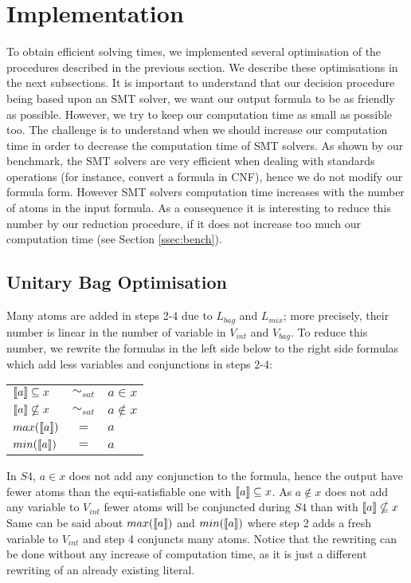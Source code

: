 
\section{Implementation}
\label{sec:implementation}
To obtain efficient solving times, we implemented several optimisation of the procedures described in the previous section.
We describe these optimisations in the next subsections.
It is important to understand that our decision procedure being based upon an SMT solver, we want our output formula to be as friendly as possible.
However, we try to keep our computation time as small as possible too.
The challenge is to understand when we should increase our computation time in order to decrease the computation time of SMT solvers.
As shown by our benchmark, the SMT solvers are very efficient when dealing with standards operations (for instance, convert a formula in CNF), hence we do not modify our formula form.
However SMT solvers computation time increases with the number of atoms in the input formula. As a consequence it is interesting to reduce this number by
our reduction procedure, if it does not increase too much our computation time (see Section \ref{ssec:bench}).

\subsection{Unitary Bag Optimisation}
Many atoms are added in steps 2-4 due to $L_{bag}$ and $L_{mix}$; more precisely, their number is linear in the number of variable in $V_{int}$ and $V_{bag}$.
To reduce this number, we rewrite the formulas in the left side below to the right side formulas which add less variables and conjunctions in steps 2-4:
\begin{center}
\begin{tabular}{lcl}
  $\llbracket a \rrbracket \subseteq x$ & $\sim_{\mathit{sat}}$ & $a \in x$ \\
  $\llbracket a \rrbracket \nsubseteq x$ & $\sim_{\mathit{sat}}$ & $a \notin x$ \\
  $max(\llbracket a \rrbracket)$ & $=$ & $a$ \\
  $min(\llbracket a \rrbracket)$ & $=$ & $a$ \\
\end{tabular}
\end{center}
In $S4$,  $a \in x$ does not add any conjunction to the formula, hence the output have fewer atoms than the equi-satisfiable one with $\llbracket a \rrbracket \subseteq x$.
As $a \notin x$ does not add any variable to $V_{int}$ fewer atoms will be conjuncted during $S4$ than with $\llbracket a \rrbracket \nsubseteq x$
Same can be said about $max(\llbracket a \rrbracket)$ and $min(\llbracket a \rrbracket)$ where step 2 adds a fresh variable to $V_{int}$ and step 4 conjuncts many atoms.
Notice that the rewriting can be done without any increase of computation time, as it is just a different rewriting of an already existing literal.


